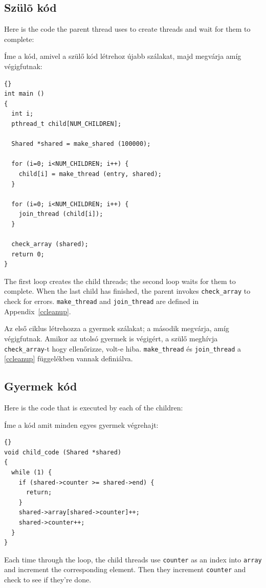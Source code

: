 \documentclass{book}
\begin{document}
\subsection{Szülõ kód}

Here is the code the parent thread uses to create threads
and wait for them to complete:

Íme a kód, amivel a szülő kód létrehoz újabb szálakat,
majd megvárja amíg végigfutnak:


\begin{lstlisting}[title={}]{}
int main ()
{
  int i;
  pthread_t child[NUM_CHILDREN];

  Shared *shared = make_shared (100000);

  for (i=0; i<NUM_CHILDREN; i++) {
    child[i] = make_thread (entry, shared);
  }

  for (i=0; i<NUM_CHILDREN; i++) {
    join_thread (child[i]);
  }

  check_array (shared);
  return 0;
}
\end{lstlisting}

The first loop creates the child threads; the second loop waits
for them to complete.  When the last child has finished, the parent
invokes {\tt check\_array} to check for errors.
{\tt make\_thread} and {\tt join\_thread} are defined in
Appendix~\ref{ccleanup}.

Az első ciklus létrehozza a gyermek szálakat; a második
megvárja, amíg végigfutnak.  Amikor az utolsó gyermek is végigért,
a szülő meghívja  {\tt check\_array}-t hogy ellenőrizze, volt-e hiba.
{\tt make\_thread} és {\tt join\_thread} a \ref{ccleanup} függelékben vannak
definiálva.

\subsection{Gyermek kód}

Here is the code that is executed by each of the children:

Íme a kód amit minden egyes gyermek végrehajt:

\begin{lstlisting}[title={}]{}
void child_code (Shared *shared)
{
  while (1) {
    if (shared->counter >= shared->end) {
      return;
    }
    shared->array[shared->counter]++;
    shared->counter++;
  }
}
\end{lstlisting}

Each time through the loop, the child threads use {\tt counter}
as an index into {\tt array} and increment the corresponding element.
Then they increment {\tt counter} and check to see if they're done.
\end{document}
